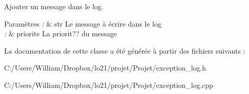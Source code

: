 Ajouter un message dans le log. 


\begin{DoxyParams}{Paramètres}
{\em \-:} & str Le message à écrire dans le log \\
\hline
{\em \-:} & priorite La priorit?? du message \\
\hline
\end{DoxyParams}


La documentation de cette classe a été générée à partir des fichiers suivants \-:\begin{DoxyCompactItemize}
\item 
C\-:/\-Users/\-William/\-Dropbox/lo21/projet/\-Projet/exception\-\_\-log.\-h\item 
C\-:/\-Users/\-William/\-Dropbox/lo21/projet/\-Projet/exception\-\_\-log.\-cpp\end{DoxyCompactItemize}
